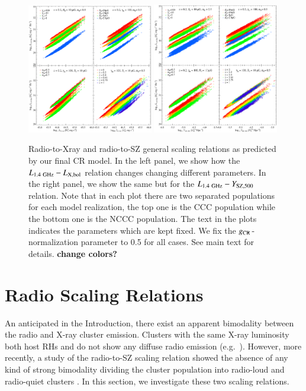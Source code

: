 \documentclass[traditabstract]{aa}
\newcommand{\rmn}{\mathrm}
\begin{document}
\begin{figure}[t]
\centering
\includegraphics[width=0.49\textwidth]{figures/PL_relation_testing_gimp.eps}
\includegraphics[width=0.49\textwidth]{figures/PSZ_relation_testing_gimp.eps}
\caption{Radio-to-Xray and radio-to-SZ general scaling relations as predicted by our final CR model. In the left panel, we show how the $L_{1.4~\rmn{GHz}}-L_{\rm{X,bol}}$ relation changes changing different parameters. In the right panel, we show the same but for the $L_{1.4~\rmn{GHz}}-Y_{\rm{SZ},500}$ relation. Note that in each plot there are two separated populations for each model realization, the top one is the CCC population while the bottom one is the NCCC population. The text in the plots indicates the parameters which are kept fixed. We fix the $g_{\rm{CR}}$-normalization parameter to 0.5 for all cases. See main text for details. {\bf change colors?}}
\label{fig:SR}
\end{figure}


\section{Radio Scaling Relations}
\label{sec:4}
An anticipated in the Introduction, there exist an apparent bimodality between the radio and X-ray cluster emission. Clusters with the same X-ray luminosity both host RHs and do not show any diffuse radio emission (e.g.~\citealp{2009A&A...507..661B,2011A&A...527A..99E}). However, more recently, a study of the radio-to-SZ scaling relation showed the absence of any kind of strong bimodality dividing the cluster population into radio-loud and radio-quiet clusters \citep{2012MNRAS.421L.112B}. In this section, we investigate these two scaling relations.
\end{document}
